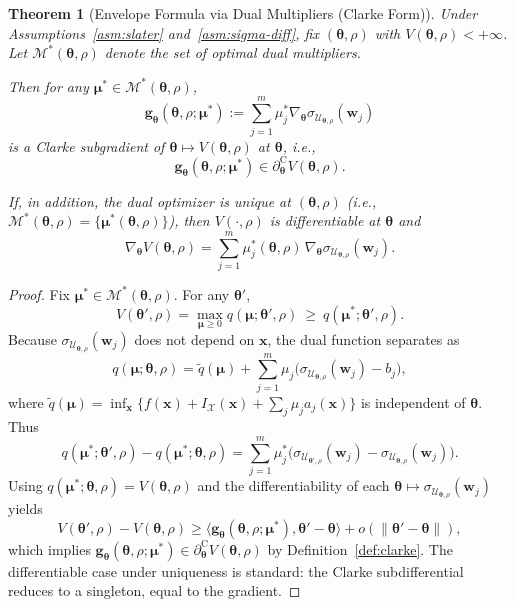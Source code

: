 \documentclass[lettersize,journal]{IEEEtran}
\newcommand{\cU}{\mathcal{U}}
\newcommand{\cX}{\mathcal{X}}
\newcommand{\ip}[2]{\langle #1, #2 \rangle}
\newcommand{\btheta}{\bm{\theta}}
\newcommand{\bmu}{\bm{\mu}}
\newcommand{\bw}{\bm{w}}
\newcommand{\bx}{\bm{x}}
\newcommand{\bg}{\bm{g}}
\newcommand{\clsubd}{\partial^{\mathrm{C}}} %
\newcommand{\cM}{\mathcal{M}} %
\newtheorem{theorem}{Theorem}
\theoremstyle{definition}
\begin{document}
\begin{theorem}[Envelope Formula via Dual Multipliers (Clarke Form)]\label{thm:envelope-theta}
Under Assumptions~\ref{asm:slater} and~\ref{asm:sigma-diff}, fix $(\btheta,\rho)$ with $V(\btheta,\rho)<+\infty$.
Let $\cM^*(\btheta,\rho)$ denote the set of optimal dual multipliers.

Then for any $\bmu^*\in\cM^*(\btheta,\rho)$,
\begin{equation}\label{eq:env-theta}
\bg_{\btheta}(\btheta,\rho;\bmu^*) := \sum_{j=1}^m \mu_j^* \nabla_{\btheta} \sigma_{\cU_{\btheta,\rho}}(\bw_j)
\end{equation}
is a Clarke subgradient of $\btheta\mapsto V(\btheta,\rho)$ at $\btheta$, i.e.,
\[
\bg_{\btheta}(\btheta,\rho;\bmu^*)\in \clsubd_{\btheta} V(\btheta,\rho).
\]

If, in addition, the dual optimizer is unique at $(\btheta,\rho)$ (i.e., $\cM^*(\btheta,\rho)=\{\bmu^*(\btheta,\rho)\}$),
then $V(\cdot,\rho)$ is differentiable at $\btheta$ and
\[
\nabla_{\btheta} V(\btheta,\rho)=\sum_{j=1}^m \mu_j^*(\btheta,\rho)\,\nabla_{\btheta}\sigma_{\cU_{\btheta,\rho}}(\bw_j).
\]
\end{theorem}

\begin{proof}
Fix $\bmu^*\in\cM^*(\btheta,\rho)$.
For any $\btheta'$,
\[
V(\btheta',\rho)=\max_{\bmu\ge 0} q(\bmu;\btheta',\rho)\ \ge\ q(\bmu^*;\btheta',\rho).
\]
Because $\sigma_{\cU_{\btheta,\rho}}(\bw_j)$ does not depend on $\bx$, the dual function separates as
\[
q(\bmu;\btheta,\rho)=\tilde q(\bmu)+\sum_{j=1}^m \mu_j\big(\sigma_{\cU_{\btheta,\rho}}(\bw_j)-b_j\big),
\]
where $\tilde q(\bmu) = \inf_{\bx}\{f(\bx) + I_{\cX}(\bx) + \sum_j \mu_j a_j(\bx)\}$ is independent of $\btheta$.
Thus
\[
q(\bmu^*;\btheta',\rho)-q(\bmu^*;\btheta,\rho)
=\sum_{j=1}^m \mu_j^*\Big(\sigma_{\cU_{\btheta',\rho}}(\bw_j)-\sigma_{\cU_{\btheta,\rho}}(\bw_j)\Big).
\]
Using $q(\bmu^*;\btheta,\rho)=V(\btheta,\rho)$ and the differentiability of each
$\btheta\mapsto\sigma_{\cU_{\btheta,\rho}}(\bw_j)$ yields
\[
V(\btheta',\rho)-V(\btheta,\rho)
\ge \ip{\bg_{\btheta}(\btheta,\rho;\bmu^*)}{\btheta'-\btheta} + o(\|\btheta'-\btheta\|),
\]
which implies $\bg_{\btheta}(\btheta,\rho;\bmu^*)\in \clsubd_{\btheta}V(\btheta,\rho)$ by Definition~\ref{def:clarke}.
The differentiable case under uniqueness is standard: the Clarke subdifferential reduces to a singleton, equal to the gradient.
\end{proof}
\end{document}
